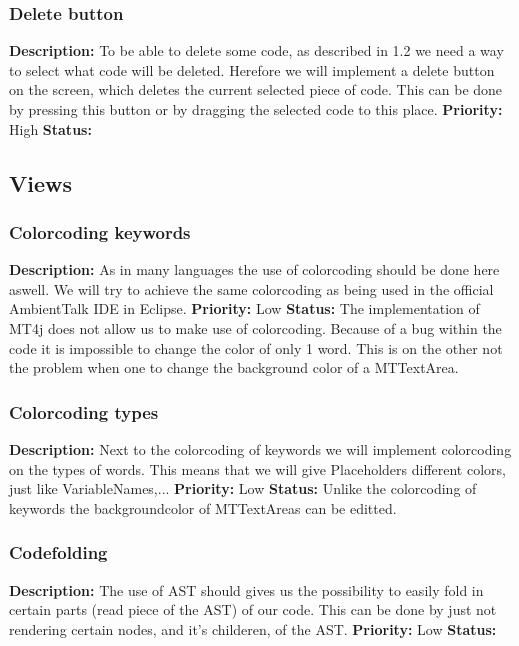 \documentclass[a4paper,12pt]{report}
\begin{document}
\subsubsection{Delete button}
\textbf{Description: } To be able to delete some code, as described in 1.2 we need a way to select what code will be deleted. Herefore we will
implement a delete button on the screen, which deletes the current selected piece of code. This can be done by pressing this button or by dragging the selected code to this place. 
\textbf{Priority:} High \newline
\textbf{Status: } \newline
\subsection{Views}
\subsubsection{Colorcoding keywords}
\textbf{Description: }As in many languages the use of colorcoding should be done here aswell. We  will try to achieve the same colorcoding as
being used in the official AmbientTalk IDE in Eclipse. \newline
\textbf{Priority:} Low \newline
\textbf{Status: } The implementation of MT4j does not allow us to make use of colorcoding. Because of a bug within the code it is impossible
to change the color of only 1 word. This is on the other not the problem when one to change the background color of a MTTextArea. \newline
\subsubsection{Colorcoding types}
\textbf{Description: } Next to the colorcoding of keywords we will implement colorcoding on the types of words. This means that we will give
Placeholders different colors, just like VariableNames,... \newline
\textbf{Priority:} Low \newline
\textbf{Status: } Unlike the colorcoding of keywords the backgroundcolor of MTTextAreas can be editted.\newline
\subsubsection{Codefolding}
\textbf{Description: }The use of AST should gives us the possibility to easily fold in certain parts (read piece of the AST) of our code. This can be done by just not
rendering certain nodes, and it's childeren, of the AST. \newline
\textbf{Priority:} Low \newline
\textbf{Status: } \newline
\end{document}
